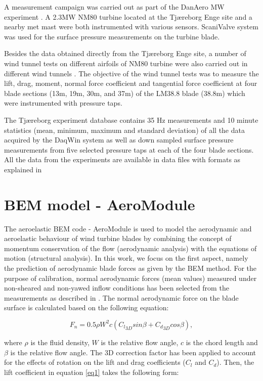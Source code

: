\documentclass[11pt]{article}
\begin{document}
A measurement campaign was carried out as part of the DanAero MW experiment \citep{DanAero}. A 2.3MW NM80 turbine located at the Tjæreborg Enge site and a nearby met mast were both instrumented with various sensors. ScaniValve system was used for the surface pressure measurements on the turbine blade. 


Besides the data obtained directly from the Tjæreborg Enge site,  a number of wind tunnel tests on different airfoils of NM80 turbine were also carried out in different wind tunnels \citep{tunnel}. The objective of the wind tunnel tests was to measure the lift, drag, moment, normal force coefficient and tangential force coefficient at four blade sections (13m, 19m, 30m, and 37m) of the LM38.8 blade (38.8m) which were instrumented with pressure taps.

The Tjæreborg experiment  database contains 35 Hz measurements and 10 minute statistics (mean, minimum, maximum and standard deviation) of all the data acquired by the DaqWin system as well as down sampled surface pressure measurements from five selected pressure taps at each of the four blade sections. All the data from the  experiments are available in data files with formats as explained in \citep{DanAero,tunnel}




\section{BEM model - AeroModule}

The aeroelastic BEM code - AeroModule  is used to model the aerodynamic and aeroelastic behaviour of wind turbine blades by combining the concept of momentum conservation of the flow (aerodynamic analysis) with the equations
of motion (structural analysis). In this work, we focus on the first aspect, namely the prediction of aerodynamic blade forces as given by the BEM method. For the purpose of calibration, normal aerodynamic forces (mean values) measured under non-sheared and non-yawed inflow conditions  has been selected from the measurements as described in \citep{DanAero}. The normal aerodynamic force on the blade surface is  calculated based on the following equation:

\begin{equation}
    F_n = 0.5\rho W^{2}c({{}{C}_l}_{3D} sin\beta + {{}{C}_d}_{3D} cos\beta),
\label{eq1}
\end{equation}

\noindent where $\rho$ is the fluid density, $W$ is the relative flow angle, $c$ is the chord length and $\beta$ is the relative flow angle. The 3D correction factor \citep{snel} has been applied to account for the effects of rotation on the lift and drag coefficients ($C_l$ and $C_d$). Then, the lift coefficient in equation \ref{eq1}  takes the following form:
\end{document}
